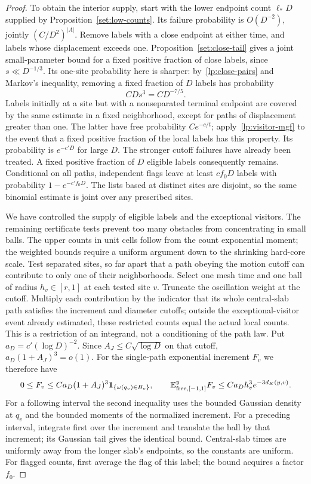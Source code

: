 \begin{proof}
To obtain the interior supply, start with the lower endpoint count
$\ell_*D$ supplied by Proposition~\ref{set:low-counts}.
Its failure probability is $O(D^{-2})$, jointly $(C/D^2)^{|A|}$.
Remove labels with a close endpoint at either time, and labels whose
displacement exceeds one.  Proposition~\ref{set:close-tail}
gives a joint small-parameter bound for a fixed positive fraction of
close labels, since $s\ll D^{-1/3}$.  Its one-site probability here
is sharper: by~\eqref{lp:close-pairs} and Markov's inequality, removing
a fixed fraction of $D$ labels has probability
\begin{equation}\label{lp:close-loss}
 CD s^3=CD^{-7/5}.
\end{equation}
Labels initially at a site but with a nonseparated terminal endpoint
are covered by the same estimate in a fixed neighborhood, except
for paths of displacement greater than one.  The latter have free
probability $Ce^{-c/t}$; apply~\eqref{lp:visitor-mgf} to the event
that a fixed positive fraction of the local labels has this property.
Its probability is $e^{-c'D}$ for large $D$.  The stronger cutoff
failures have already been treated.  A fixed positive fraction of
$D$ eligible labels consequently remains.  Conditional on all paths,
independent flags leave at least $cf_0D$ labels with probability
$1-e^{-c'f_0D}$.  The lists based at distinct sites are disjoint, so
the same binomial estimate is joint over any prescribed sites.

We have controlled the supply of eligible labels and the exceptional
visitors.  The remaining certificate tests prevent too many obstacles
from concentrating in small balls.  The upper counts in unit cells
follow from the count exponential moment; the weighted bounds require
a uniform argument down to the shrinking hard-core scale.  Test separated sites, so
far apart that a path obeying the motion cutoff can contribute to
only one of their neighborhoods.  Select one mesh time and one ball
of radius $h_v\in[r,1]$ at each tested site $v$.  Truncate the
oscillation weight at the cutoff.  Multiply each contribution by the
indicator that its whole central-slab path satisfies the increment and
diameter cutoffs; outside the exceptional-visitor event already estimated,
these restricted counts equal the actual local counts.  This is a
restriction of an integrand, not a conditioning of the path law.  Put
$a_D=c'(\log D)^{-2}$.  Since $A_J\leq C\sqrt{\log D}$ on that
cutoff, $a_D(1+A_J)^3=o(1)$.  For the single-path exponential increment
$F_v$ we therefore have
\[
 0\leq F_v\leq C a_D(1+A_J)^3
     \mathbf 1_{\{\omega(q_v)\in B_v\}},\qquad
 \mathbb E_{\mathrm{free},[-1,1]}^y F_v
       \leq C a_D h_v^3e^{-3d_K(y,v)}.
\]
For a following interval the second inequality uses the bounded
Gaussian density at $q_v$ and the bounded moments of the normalized
increment.  For a preceding interval, integrate first over the
increment and translate the ball by that increment; its Gaussian
tail gives the identical bound.  Central-slab times are uniformly
away from the longer slab's endpoints, so the constants are uniform.
For flagged counts, first average the flag of this label; the bound
acquires a factor $f_0$.


\end{proof}
